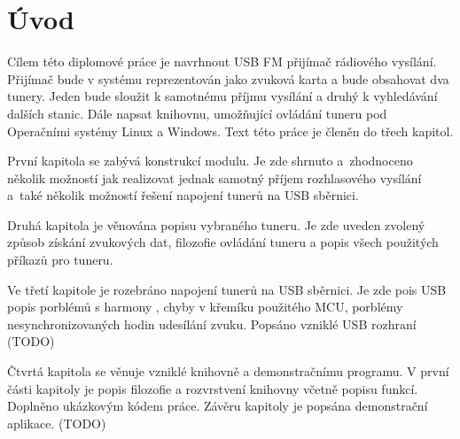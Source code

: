 \section{Úvod}
\label{sec:Uvod}

Cílem této diplomové práce je navrhnout USB FM přijímač rádiového vysílání. Přijímač bude v systému reprezentován jako zvuková karta a bude obsahovat dva tunery. Jeden bude sloužit k samotnému příjmu vysílání a druhý k vyhledávání dalších stanic. Dále napsat knihovnu, umožňující ovládání tuneru pod Operačními systémy Linux a Windows. Text této práce je členěn do třech kapitol.

První kapitola se zabývá konstrukcí modulu. Je zde shrnuto a~zhodnoceno několik možností jak realizovat jednak samotný příjem rozhlasového vysílání a~také několik možností řešení napojení tunerů na USB sběrnici.

Druhá kapitola je věnována popisu vybraného tuneru. Je zde uveden zvolený způsob získání zvukových dat, filozofie ovládání tuneru a popis všech použitých příkazů pro tuneru.

Ve třetí kapitole je rozebráno napojení tunerů na USB sběrnici. Je zde pois USB popis porblémů s harmony , chyby v křemíku použitého MCU, porblémy nesynchronizovaných hodin udesílání zvuku. Popsáno vzniklé USB rozhraní (TODO)

Čtvrtá kapitola se věnuje vzniklé knihovně a demonstračnímu programu. V první části kapitoly je popis filozofie a rozvrstvení knihovny včetně popisu funkcí. Doplněno ukázkovým kódem práce. Závěru kapitoly je popsána demonstrační aplikace. (TODO)

